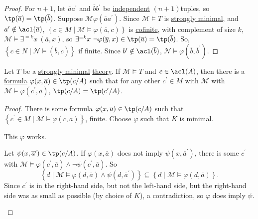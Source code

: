 \begin{proof}
	For \(n + 1\), let \(\overline{a} a^{\prime} \) and \(\overline{b} b^{\prime} \) be \hyperref[def:independent]{independent} \((n+1)\)tuples, so \(\tp(\overline{a} ) = \tp(\overline{b} )\). Suppose \(\mathcal{M} \varphi (\overline{a} a^{\prime} )\). Since \(\mathcal{M} \models T\) is \hyperref[def:strongly-minimal]{strongly minimal}, and \(a^{\prime} \notin\acl(\overline{a} )\), \(\left\{ c\in M \mid \mathcal{M} \models \varphi (\overline{a} , c) \right\} \) is \hyperref[def:cofinite]{cofinite}, with complement of size \(k\), \(\mathcal{M} \models \exists ^{=k}x\ (\overline{a} , x)\), so \(\exists ^{=k}x\ \lnot \varphi (\overline{y} , x) \in \tp(\overline{a} ) = \tp(\overline{b} )\). So, \(\left\{ c\in N \mid \mathcal{N} \models (\overline{b} , c) \right\} \) if finite. Since \(b^{\prime} \notin \acl(\overline{b} )\), \(\mathcal{N} \models \varphi (\overline{b} , \overline{b} ^{\prime} )\).
\end{proof}

\begin{lemma}\label{lma:lec19}
	Let \(T\) be a \hyperref[def:strongly-minimal]{strongly minimal} \hyperref[def:theory]{theory}. If \(\mathcal{M} \models T\) and \(c\in \acl(A)\), then there is a \hyperref[def:formula]{formula} \(\varphi (x, \overline{a} ) \in \tp(c / A)\) such that for any other \(c^{\prime} \in M\) with \(\mathcal{M} \) with \(\mathcal{M} \models \varphi (c^{\prime} , \overline{a} )\), \(\tp(c / A) = \tp(c^{\prime} / A)\).
\end{lemma}
\begin{proof}
	There is some \hyperref[def:formula]{formula} \(\varphi (x, \overline{a} )\in \tp(c / A)\) such that \(\left\{ c^{\prime} \in M \mid \mathcal{M} \models \varphi (\overline{c} , \overline{a} ) \right\} \), finite. Choose \(\varphi \) such that \(K\) is minimal.

	\begin{claim}
		This \(\varphi \) works.
	\end{claim}
	\begin{explanation}
		Let \(\psi (x, \overline{a} ^{\prime} )\in \tp(c / A)\). If \(\varphi (x, \overline{a} )\) does not imply \(\psi (x, \overline{a} ^{\prime} )\), there is some \(c^{\prime} \) with \(\mathcal{M} \models \varphi (c^{\prime} , \overline{a} ) \land \lnot \psi (c^{\prime} , \overline{a} )\). So
		\[
			\left\{ d \mid \mathcal{M} \models \varphi (d, \overline{a} ) \land \psi (d, \overline{a} ^{\prime} ) \right\} \subseteq \left\{ d \mid \mathcal{M} \models \varphi (d, \overline{a} ) \right\}.
		\]
		Since \(c^{\prime} \) is in the right-hand side, but not the left-hand side, but the right-hand side was as small as possible (by choice of \(K\)), a contradiction, so \(\varphi \) does imply \(\psi \).
	\end{explanation}
\end{proof}

